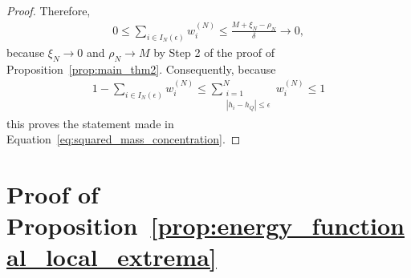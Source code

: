 \begin{proof}
    Therefore,
    \begin{align*}
        0\le\sum_{i\in I_N(\epsilon)}w_i^{(N)}\le\frac{M+\xi_N-\rho_N}{\delta}\to0,
    \end{align*}
    because $\xi_N\to0$ and $\rho_N\to M$ by Step 2 of the proof of Proposition~\ref{prop:main_thm2}. Consequently, because
    \begin{align*}
        1-\sum_{i\in I_N(\epsilon)}w_i^{(N)}\le\sum_{\substack{i=1\\|h_i-h_Q|\le\epsilon}}^{N}w_i^{(N)}\le 1
    \end{align*}
    this proves the statement made in Equation~\eqref{eq:squared_mass_concentration}.
\end{proof}

\section{Proof of Proposition~\ref{prop:energy_functional_local_extrema}}\label{sec:proof_energy_functional_local_extrema}

